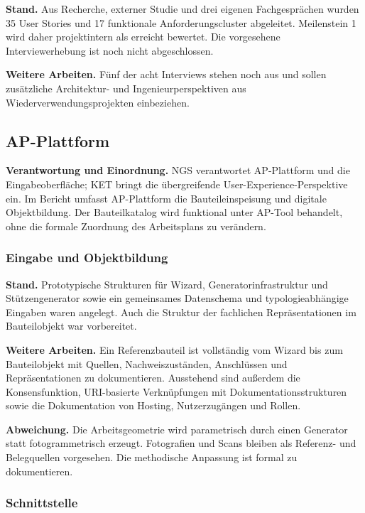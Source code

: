 \documentclass[type=zwischenbericht,theme=dark]{zukunftbau}
\begin{document}
\textbf{Stand.} Aus Recherche, externer Studie und drei eigenen Fachgesprächen wurden 35 User Stories und 17 funktionale Anforderungscluster abgeleitet. Meilenstein 1 wird daher projektintern als erreicht bewertet. Die vorgesehene Interviewerhebung ist noch nicht abgeschlossen.

\textbf{Weitere Arbeiten.} Fünf der acht Interviews stehen noch aus und sollen zusätzliche Architektur- und Ingenieurperspektiven aus Wiederverwendungsprojekten einbeziehen.

\subsection{AP-Plattform}

\textbf{Verantwortung und Einordnung.} NGS verantwortet AP-Plattform und die Eingabeoberfläche; KET bringt die übergreifende User-Experience-Perspektive ein. Im Bericht umfasst AP-Plattform die Bauteileinspeisung und digitale Objektbildung. Der Bauteilkatalog wird funktional unter AP-Tool behandelt, ohne die formale Zuordnung des Arbeitsplans zu verändern.

\subsubsection{Eingabe und Objektbildung}

\textbf{Stand.} Prototypische Strukturen für Wizard, Generatorinfrastruktur und Stützengenerator sowie ein gemeinsames Datenschema und typologieabhängige Eingaben waren angelegt. Auch die Struktur der fachlichen Repräsentationen im Bauteilobjekt war vorbereitet.

\textbf{Weitere Arbeiten.} Ein Referenzbauteil ist vollständig vom Wizard bis zum Bauteilobjekt mit Quellen, Nachweiszuständen, Anschlüssen und Repräsentationen zu dokumentieren. Ausstehend sind außerdem die Konsensfunktion, URI-basierte Verknüpfungen mit Dokumentationsstrukturen sowie die Dokumentation von Hosting, Nutzerzugängen und Rollen.

\textbf{Abweichung.} Die Arbeitsgeometrie wird parametrisch durch einen Generator statt fotogrammetrisch erzeugt. Fotografien und Scans bleiben als Referenz- und Belegquellen vorgesehen. Die methodische Anpassung ist formal zu dokumentieren.

\subsubsection{Schnittstelle}
\end{document}
